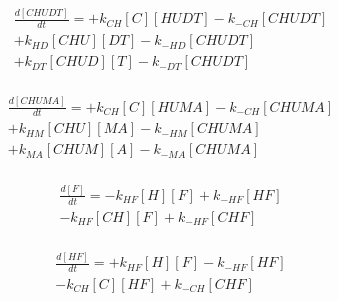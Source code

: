 \begin{equation}
\begin{split}
\frac{d[CHUDT]}{dt} = + k_{CH}[C][HUDT] - k_{-CH}[CHUDT]  \\%
                      + k_{HD}[CHU][DT] - k_{-HD}[CHUDT]  \\%
                      + k_{DT}[CHUD][T] - k_{-DT}[CHUDT]  \\%
\end{split}
\end{equation}

\begin{equation}
\begin{split}
\frac{d[CHUMA]}{dt} = + k_{CH}[C][HUMA] - k_{-CH}[CHUMA]  \\%
                      + k_{HM}[CHU][MA] - k_{-HM}[CHUMA]  \\%
                      + k_{MA}[CHUM][A] - k_{-MA}[CHUMA]  \\%
\end{split}
\end{equation}

\begin{equation}
\begin{split}
\frac{d[F]}{dt} =     - k_{HF}[H][F]    + k_{-HF}[HF]     \\%
                      - k_{HF}[CH][F]   + k_{-HF}[CHF]    \\%
\end{split}
\end{equation}

\begin{equation}
\begin{split}
\frac{d[HF]}{dt} =    + k_{HF}[H][F]    - k_{-HF}[HF]     \\%
                      - k_{CH}[C][HF]   + k_{-CH}[CHF]    \\%
\end{split}
\end{equation}


